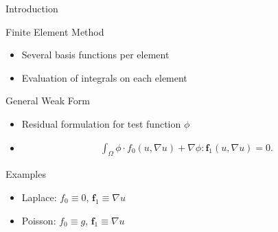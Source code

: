 

\begin{frame}{Introduction}

 \begin{block}{Finite Element Method}
  \begin{itemize}
   \item Several basis functions per element
   \item Evaluation of integrals on each element
  \end{itemize}
 \end{block}

 \begin{block}{General Weak Form}
  \begin{itemize}
   \item Residual formulation for test function $\phi$
   \item \begin{align*}
    \int_\Omega \phi\cdot f_0(u,\nabla u) + \nabla\phi:\mathbf{f}_1(u,\nabla u) = 0.
         \end{align*}

  \end{itemize}
 \end{block}

  \begin{block}{Examples}
  \begin{itemize}
   \item Laplace: $f_0 \equiv 0$, $\mathbf{f}_1 \equiv \nabla u$
   \item Poisson: $f_0 \equiv g$, $\mathbf{f}_1 \equiv \nabla u$
  \end{itemize}
 \end{block}

\end{frame}



